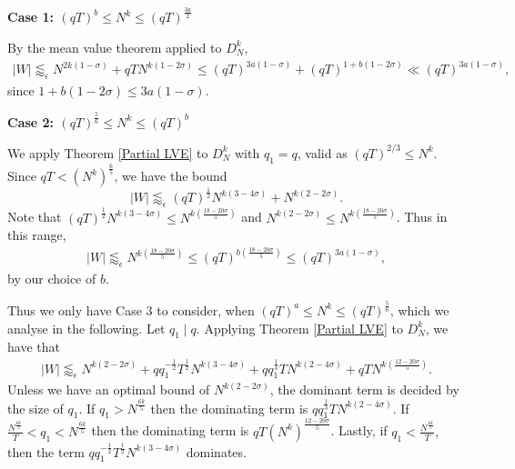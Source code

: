 \documentclass[12pt]{amsart}
\theoremstyle{definition}
\theoremstyle{plain}
\theoremstyle{remark}
\numberwithin{equation}{section}
\numberwithin{theorem}{section}
\numberwithin{equation}{section}
\begin{document}
	\textbf{Case 1:  $(qT)^b \leq N^k \leq (qT)^{\frac{3a}{2}}$}
	
	By the mean value theorem applied to $D_N^k$,
	\begin{align*}
		|W| \lessapprox_{\epsilon} N^{2k(1-\sigma)}+qTN^{k(1-2\sigma)} \leq (qT)^{3a(1-\sigma)}+(qT)^{1+b(1-2\sigma)} \ll (qT)^{3a(1-\sigma)},
	\end{align*}
	since $1+b(1-2\sigma) \leq 3a(1-\sigma)$. 
	
	\textbf{Case 2: $(qT)^{\frac{5}{6}} \leq N^k \leq (qT)^b$}
	
	We apply Theorem \ref{Partial LVE} to $D_N^k$ with $q_1=q$, valid as $(qT)^{2/3} \leq N^k$. Since $qT<(N^k)^{\frac{6}{5}}$, we have the bound
	\[
	|W| \lessapprox_{\epsilon} (qT)^{\frac{1}{2}}N^{k(3-4\sigma)}+N^{k(2-2\sigma)}.
	\]
	Note that $(qT)^{\frac{1}{2}}N^{k(3-4\sigma)} \leq N^{k(\frac{18-20\sigma}{5})}$ and $N^{k(2-2\sigma)} \leq N^{k(\frac{18-20\sigma}{5})}$. Thus in this range, 
	\begin{align*}
		|W| \lessapprox_{\epsilon} N^{k(\frac{18-20\sigma}{5})} \leq (qT)^{b ({\frac{18-20\sigma}{5}})} \leq (qT)^{3a(1-\sigma)},
	\end{align*}
	by our choice of $b$.
	
	Thus we only have Case 3 to consider, when $(qT)^a \leq N^k \leq (qT)^{\frac{5}{6}}$, which we analyse in the following. Let $q_1 \mid q$. Applying Theorem \ref{Partial LVE} to $ D_N^k$, we have that
	\begin{align*}
		|W| \lessapprox_{\epsilon} N^{k(2-2\sigma)}+ qq_1^{-\frac{1}{2}}T^{\frac{1}{2}}N^{k(3-4\sigma)}+ q q_1^{\frac{1}{3}}TN^{k(2-4\sigma)} + qTN^{k(\frac{12-20\sigma}{5})}.
	\end{align*}
	Unless we have an optimal bound of $N^{k(2-2\sigma)}$, the dominant term is decided by the size of $q_1$. If $q_1 > N^{\frac{6k}{5}}$ then the dominating term is $qq_1^{\frac{1}{3}}TN^{k(2-4\sigma)}$. If $\frac{N^{\frac{6k}{5}}}{T} < q_1 < N^{\frac{6k}{5}}$ then the dominating term is $qT(N^k)^{\frac{12-20\sigma}{5}}$. Lastly, if $q_1 < \frac{N^{\frac{6k}{5}}}{T},$ then the term $qq_1^{-\frac{1}{2}}T^{\frac{1}{2}}N^{k(3-4\sigma)}$ dominates.
	
\end{document}

